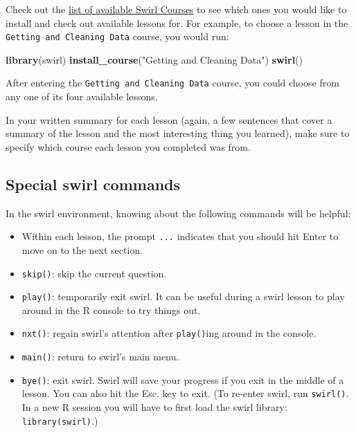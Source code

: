 \documentclass[]{book}
\makeatletter
\newenvironment{Shaded}{\begin{snugshade}}{\end{snugshade}}
\newcommand{\KeywordTok}[1]{\textcolor[rgb]{0.13,0.29,0.53}{\textbf{#1}}}
\newcommand{\StringTok}[1]{\textcolor[rgb]{0.31,0.60,0.02}{#1}}
\newcommand{\NormalTok}[1]{#1}
\providecommand{\tightlist}{%
  \setlength{\itemsep}{0pt}\setlength{\parskip}{0pt}}
\newenvironment{kframe}{%
\medskip{}
\setlength{\fboxsep}{.8em}
 \def\at@end@of@kframe{}%
 \ifinner\ifhmode%
  \def\at@end@of@kframe{\end{minipage}}%
  \begin{minipage}{\columnwidth}%
 \fi\fi%
 \def\FrameCommand##1{\hskip\@totalleftmargin \hskip-\fboxsep
 \colorbox{shadecolor}{##1}\hskip-\fboxsep
     \hskip-\linewidth \hskip-\@totalleftmargin \hskip\columnwidth}%
 \MakeFramed {\advance\hsize-\width
   \@totalleftmargin\z@ \linewidth\hsize
   \@setminipage}}%
 {\par\unskip\endMakeFramed%
 \at@end@of@kframe}
\renewenvironment{Shaded}{\begin{kframe}}{\end{kframe}}
\theoremstyle{definition}
\theoremstyle{definition}
\theoremstyle{definition}
\theoremstyle{remark}
\makeatother
\begin{document}
Check out the \href{http://swirlstats.com/scn/title.html}{list of
available Swirl Courses} to see which ones you would like to install and
check out available lessons for. For example, to choose a lesson in the
\texttt{Getting\ and\ Cleaning\ Data} course, you would run:

\begin{Shaded}
\begin{Highlighting}[]
\KeywordTok{library}\NormalTok{(swirl)}
\KeywordTok{install_course}\NormalTok{(}\StringTok{"Getting and Cleaning Data"}\NormalTok{)}
\KeywordTok{swirl}\NormalTok{()}
\end{Highlighting}
\end{Shaded}

After entering the \texttt{Getting\ and\ Cleaning\ Data} course, you
could choose from any one of its four available lessons.

In your written summary for each lesson (again, a few sentences that
cover a summary of the lesson and the most interesting thing you
learned), make sure to specify which course each lesson you completed
was from.

\subsection{Special swirl commands}\label{special-swirl-commands}

In the swirl environment, knowing about the following commands will be
helpful:

\begin{itemize}
\tightlist
\item
  Within each lesson, the prompt \texttt{...} indicates that you should
  hit Enter to move on to the next section.
\item
  \texttt{skip()}: skip the current question.
\item
  \texttt{play()}: temporarily exit swirl. It can be useful during a
  swirl lesson to play around in the R console to try things out.
\item
  \texttt{nxt()}: regain swirl's attention after \texttt{play()}ing
  around in the console.
\item
  \texttt{main()}: return to swirl's main menu.
\item
  \texttt{bye()}: exit swirl. Swirl will save your progress if you exit
  in the middle of a lesson. You can also hit the Esc. key to exit. (To
  re-enter swirl, run \texttt{swirl()}. In a new R session you will have
  to first load the swirl library: \texttt{library(swirl)}.)
\end{itemize}
\end{document}
